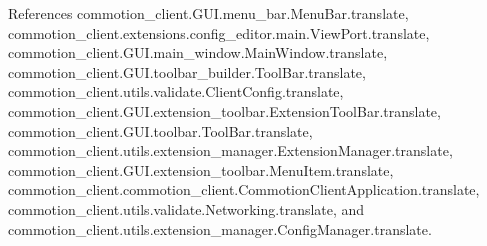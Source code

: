 References commotion\+\_\+client.\+G\+U\+I.\+menu\+\_\+bar.\+Menu\+Bar.\+translate, commotion\+\_\+client.\+extensions.\+config\+\_\+editor.\+main.\+View\+Port.\+translate, commotion\+\_\+client.\+G\+U\+I.\+main\+\_\+window.\+Main\+Window.\+translate, commotion\+\_\+client.\+G\+U\+I.\+toolbar\+\_\+builder.\+Tool\+Bar.\+translate, commotion\+\_\+client.\+utils.\+validate.\+Client\+Config.\+translate, commotion\+\_\+client.\+G\+U\+I.\+extension\+\_\+toolbar.\+Extension\+Tool\+Bar.\+translate, commotion\+\_\+client.\+G\+U\+I.\+toolbar.\+Tool\+Bar.\+translate, commotion\+\_\+client.\+utils.\+extension\+\_\+manager.\+Extension\+Manager.\+translate, commotion\+\_\+client.\+G\+U\+I.\+extension\+\_\+toolbar.\+Menu\+Item.\+translate, commotion\+\_\+client.\+commotion\+\_\+client.\+Commotion\+Client\+Application.\+translate, commotion\+\_\+client.\+utils.\+validate.\+Networking.\+translate, and commotion\+\_\+client.\+utils.\+extension\+\_\+manager.\+Config\+Manager.\+translate.


